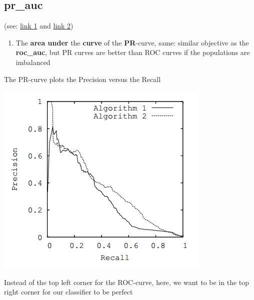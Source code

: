 \documentclass[12pt,a4paper]{article}
\begin{document}
\subsection{pr\_auc}
(see: \href{http://www.chioka.in/differences-between-roc-auc-and-pr-auc/}{link 1} and \href{https://acutecaretesting.org/en/articles/precision-recall-curves-what-are-they-and-how-are-they-used}{link 2})
\begin{enumerate}
\item The \textbf{area under} the \textbf{curve} of the \textbf{PR}-curve, same: similar objective as the \textbf{roc\_auc}, but PR curves are better than ROC curves if the populations are imbalanced
\end{enumerate}
\begin{description}
\item The PR-curve plots the Precision versus the Recall 
\item \includegraphics[scale=0.7]{resources/3/PRcurve}
\item Instead of the top left corner for the ROC-curve, here, we want to be in the top right corner for our classifier to be perfect
\end{description}
%
\end{document}
